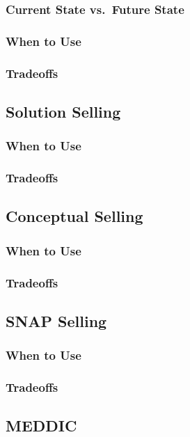         \subsubsection{Current State vs.\ Future State}\mbox{}
        \subsubsection{When to Use}\mbox{}
        \subsubsection{Tradeoffs}\mbox{}
    \subsection{Solution Selling}\mbox{}
        \subsubsection{When to Use}\mbox{}
        \subsubsection{Tradeoffs}\mbox{}
    \subsection{Conceptual Selling}\mbox{}
        \subsubsection{When to Use}\mbox{}
        \subsubsection{Tradeoffs}\mbox{}
    \subsection{SNAP Selling}\mbox{}
        \subsubsection{When to Use}\mbox{}
        \subsubsection{Tradeoffs}\mbox{}
    \subsection{MEDDIC}\mbox{}
